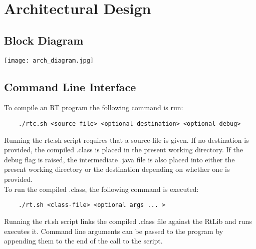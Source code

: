 \documentclass{report}
\begin{document}


\newenvironment{myindentpar}[1]%
{\begin{list}{}%
    {\setlength{\leftmargin}{#1}}%
        \item[]%
}
{\end{list}}
                  
\chapter{Architectural Design}

\section{Block Diagram}
\begin{center}
\texttt{[image: arch\_diagram.jpg]}
\end{center}

\section{Command Line Interface}
To compile an RT program the following command is run:
\begin{verbatim}
	./rtc.sh <source-file> <optional destination> <optional debug>
\end{verbatim}
Running the rtc.sh script requires that a source-file is given. If no destination is provided, the compiled .class
is placed in the present working directory. If the debug flag is raised, the intermediate .java file is 
also placed into either the present working directory or the destination depending on whether one 
is provided.\\
To run the compiled .class, the following command is executed:
\begin{verbatim}
	./rt.sh <class-file> <optional args ... >
\end{verbatim}
Running the rt.sh script links the compiled .class file against the RtLib and runs executes it. 
Command line arguments can be passed to the program by appending them to the end of the call
to the script.
\end{document}
